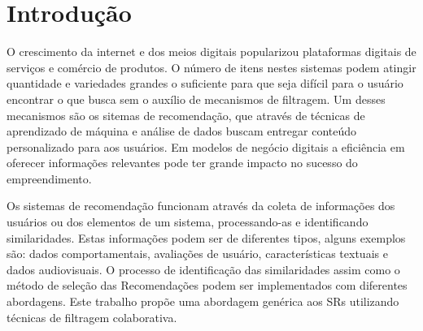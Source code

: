 \documentclass[
	12pt,				%
    oneside,			%
	a4paper,			%
	english,			%
	french,				%
	spanish,			%
	brazil,				%
	]{abntex2}
\begin{document}


\tableofcontents*


\textual


\chapter{Introdução} %

O crescimento da internet e dos meios digitais popularizou plataformas digitais de serviços e comércio de produtos.
O número de itens nestes sistemas podem atingir quantidade e variedades grandes o suficiente para que seja difícil para o usuário 
encontrar o que busca sem o auxílio de mecanismos de filtragem. Um desses mecanismos são os sitemas de recomendação, que através de técnicas
de aprendizado de máquina e análise de dados buscam entregar conteúdo personalizado para aos usuários. Em modelos de negócio digitais a eficiência em 
oferecer informações relevantes pode ter grande impacto no sucesso do empreendimento.

Os sistemas de recomendação funcionam através da coleta de informações dos usuários ou dos elementos de um sistema, processando-as e 
identificando similaridades. Estas informações podem ser de diferentes tipos, alguns exemplos são: dados comportamentais, avaliações de usuário,
características textuais e dados audiovisuais. O processo de identificação das similaridades assim como o método de seleção das Recomendações podem 
ser implementados com diferentes abordagens. Este trabalho propõe uma abordagem genérica aos SRs utilizando técnicas de filtragem colaborativa.
\end{document}
